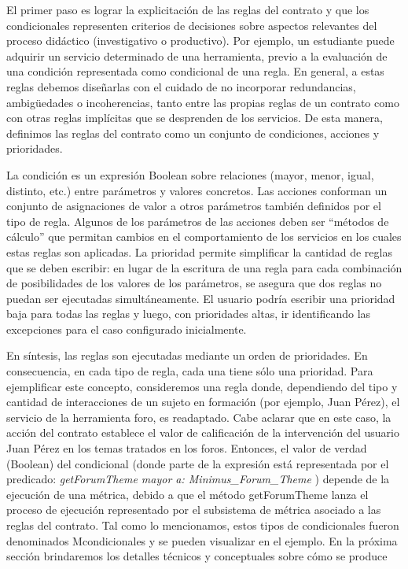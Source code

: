 El primer paso es lograr la explicitación de las reglas del contrato y que
los condicionales representen criterios de decisiones sobre aspectos relevantes
del proceso didáctico (investigativo o productivo). Por ejemplo, un estudiante
puede adquirir un servicio determinado de una herramienta, previo a la
evaluación de una condición representada como condicional de una regla.
En general, a estas reglas debemos diseñarlas con el cuidado de no incorporar
redundancias, ambigüedades o incoherencias, tanto entre las propias
reglas de un contrato como con otras reglas implícitas que se desprenden de
los servicios. De esta manera, definimos las reglas del contrato como un conjunto
de condiciones, acciones y prioridades.

La condición es un expresión Boolean sobre relaciones (mayor, menor,
igual, distinto, etc.) entre parámetros y valores concretos.
Las acciones conforman un conjunto de asignaciones de valor a otros parámetros
también definidos por el tipo de regla. Algunos de los parámetros de
las acciones deben ser “métodos de cálculo” que permitan cambios en el comportamiento
de los servicios en los cuales estas reglas son aplicadas.
La prioridad permite simplificar la cantidad de reglas que se deben escribir:
en lugar de la escritura de una regla para cada combinación de posibilidades
de los valores de los parámetros, se asegura que dos reglas no puedan ser
ejecutadas simultáneamente. El usuario podría escribir una prioridad baja para
todas las reglas y luego, con prioridades altas, ir identificando las excepciones
para el caso configurado inicialmente.

En síntesis, las reglas son ejecutadas mediante un orden de prioridades. En
consecuencia, en cada tipo de regla, cada una tiene sólo una prioridad.
Para ejemplificar este concepto, consideremos una regla donde, dependiendo
del tipo y cantidad de interacciones de un sujeto en formación (por
ejemplo, Juan Pérez), el servicio de la herramienta foro, es readaptado. Cabe
aclarar que en este caso, la acción del contrato establece el valor de calificación
de la intervención del usuario Juan Pérez en los temas tratados en los
foros. Entonces, el valor de verdad (Boolean) del condicional (donde parte de
la expresión está representada por el predicado: \textit{getForumTheme mayor a:
Minimus\_Forum\_Theme} ) depende de la ejecución de una métrica, debido a
que el método getForumTheme lanza el proceso de ejecución representado por
el subsistema de métrica asociado a las reglas del contrato.
Tal como lo mencionamos, estos tipos de condicionales fueron denominados
Mcondicionales y se pueden visualizar en el ejemplo. En la próxima sección
brindaremos los detalles técnicos y conceptuales sobre cómo se produce

